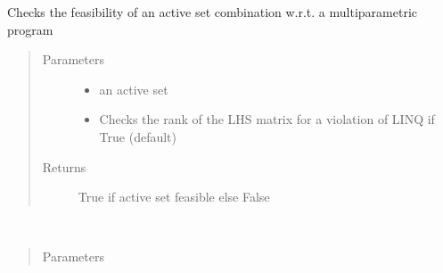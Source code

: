 \documentclass[letterpaper,10pt,english]{sphinxmanual}
\begin{document}
\begin{fulllineitems}

\begin{fulllineitems}
\label{\detokenize{ppopt:ppopt.mplp_program.MPLP_Program.check_feasibility}}
\sphinxAtStartPar
Checks the feasibility of an active set combination w.r.t. a multiparametric program
\begin{quote}\begin{description}
\item[{Parameters}] \leavevmode\begin{itemize}
\item {} 
\sphinxAtStartPar
{} \textendash{} an active set

\item {} 
\sphinxAtStartPar
{} \textendash{} Checks the rank of the LHS matrix for a violation of LINQ if True (default)

\end{itemize}

\item[{Returns}] \leavevmode
\sphinxAtStartPar
True if active set feasible else False

\end{description}\end{quote}

\end{fulllineitems}


\begin{fulllineitems}
\label{\detokenize{ppopt:ppopt.mplp_program.MPLP_Program.check_optimality}}~\begin{quote}\begin{description}
\item[{Parameters}] \leavevmode
\sphinxAtStartPar
{} \textendash{} 


\end{description}
\end{quote}
\end{fulllineitems}
\end{fulllineitems}
\end{document}

